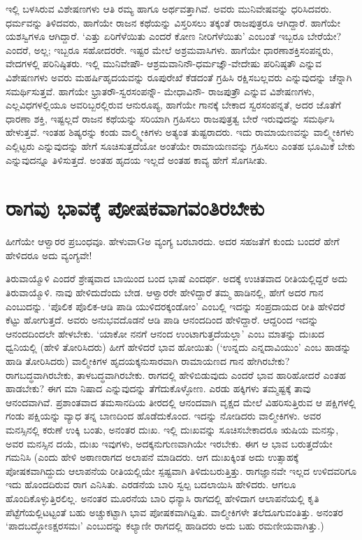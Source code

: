 ಇಲ್ಲಿ ಬಳಸಿರುವ ವಿಶೇಷಣಗಳು ಆತಿ ರಮ್ಯ ಹಾಗೂ ಅರ್ಥವತ್ತಾಗಿವೆ. ಅವರು ಮುನಿವೇಷವನ್ನು ಧರಿಸಿದವರು. ಧರ್ಮವನ್ನು ತಿಳಿದವರು, ಹಾಗೆಯೇ ರಾಜನ ಕಥೆಯನ್ನು ವಿಸ್ತರಿಸಲು ತಕ್ಕಂತೆ ರಾಜಪುತ್ರರೂ ಆಗಿದ್ದಾರೆ. ಹಾಗೆಯೇ ಯಶಸ್ವಿಗಳೂ ಆಗಿದ್ದಾರೆ. `ಎತ್ತು ಏರಿಗೆಳೆಯಿತು ಎಂದರೆ ಕೋಣ ನೀರಿಗೆಳೆಯಿತು' ಎಂಬಂತೆ ಇಬ್ಬರೂ ಬೇರೆಯೇ? ಎಂದರೆ, ಅಲ್ಲ; ಇಬ್ಬರೂ ಸಹೋದರರೇ. ಇಷ್ಟರ ಮೇಲೆ ಅಶ್ರಮವಾಸಿಗಳು. ಹಾಗೆಯೇ ಧಾರಣಾಶಕ್ತಿಸಂಪನ್ನರು, ವೇದಗಳಲ್ಲಿ ಪರಿನಿಷ್ಠಿತರು. ಇಲ್ಲಿ ಮುನಿವೇಷೌ- ಆಶ್ರಮವಾನಿನೌ-ಧರ್ಮಜ್ಞೌ-ವೇದೇಷು ಪರಿನಿಷ್ಠತೌ ಎನ್ನುವ ವಿಶೇಷಣಗಳು ಅವರು ಮಹರ್ಷಿಹೃದಯವನ್ನು ರೂಪುರೇಖೆ ಕೆಡದಂತೆ ಗ್ರಹಿಸಿ ರಕ್ಷಿಸಬಲ್ಲವರು ಎನ್ನುವುದನ್ನು ಚೆನ್ನಾಗಿ ಸಮರ್ಥಿಸುತ್ತವೆ. ಹಾಗೆಯೇ ಭ್ರಾತರೌ-ಸ್ವರಸಂಪನ್ನೌ- ಮೇಧಾವಿನೌ- ರಾಜಪುತ್ರೌ ಎನ್ನುವ ವಿಶೇಷಣಗಳು, ಎಲ್ಲವಿಧಗಳಲ್ಲಿಯೂ ಅವರಿಬ್ಬರಲ್ಲಿರುವ ಆನುರೂಪ್ಯ, ಹಾಗೆಯೇ ಗಾನಕ್ಕೆ ಬೇಕಾದ ಸ್ವರಸಂಪನ್ನತೆ, ಅದರ ಜೊತೆಗೆ ಧಾರಣಾ ಶಕ್ತಿ, ಇಷ್ಟಲ್ಲದೆ ರಾಜನ ಕಥೆಯನ್ನು ಸರಿಯಾಗಿ ಗ್ರಹಿಸಲು ರಾಜಪುತ್ರತ್ವ ಬೇರೆ ಇರುವುದನ್ನು ಸಮರ್ಥಿಸಿ ಹೇಳುತ್ತವೆ. ಇಂತಹ ಶಿಷ್ಯರನ್ನು ಕಂಡು ವಾಲ್ಮ್ಮೀಕಿಗಳು ಅತ್ಯಂತ ತುಷ್ಟರಾದರು. ಇದು ರಾಮಾಯಣವನ್ನು  ವಾಲ್ಮ್ಮೀಕಿಗಳು ಎಲ್ಲಿಟ್ಟರು ಎನ್ನುವುದನ್ನು ಹೇಗೆ ಸೂಚಿಸುತ್ತದೆಯೋ ಅಂತೆಯೇ ರಾಮಾಯಣವನ್ನು ಗ್ರಹಿಸಲು ಎಂತಹ ಭೂಮಿಕೆ ಬೇಕು ಎನ್ನುವುದನ್ನೂ ತಿಳಿಸುತ್ತದೆ. ಅಂತಹ ಹೃದಯ ಇಲ್ಲದೆ ಅಂತಹ ಕಾವ್ಯ ಹೇಗೆ ಸೊಗಸೀತು. 

\section*{ರಾಗವು ಭಾವಕ್ಕೆ ಪೋಷಕವಾಗವಂತಿರಬೇಕು}

ಹೀಗೆಯೇ ಆಳ್ವಾರರ ಪ್ರಬಂಧವೂ. ಹೇಳುವಾGಅ ವ್ಯಂಗ್ಯ ಬರಬಾರದು. ಅದರ ಸಹಜತೆಗೆ ಕುಂದು ಬಂದರೆ ಹೇಗೆ ಹೇಳಿದರೂ ಅದು ವ್ಯಂಗ್ಯವೇ!

ತಿರುವಾಯ್ಮೊಳಿ ಎಂದರೆ ಶ್ರೇಷ್ಠವಾದ ಬಾಯಿಂದ ಬಂದ ಭಾಷೆ ಎಂದರ್ಥ. ಅದಕ್ಕೆ ಉಚಿತವಾದ ರೀತಿಯಲ್ಲಿದ್ದರೆ ಅದು ತಿರುವಾಯ್ಮೊಳಿ. ನಾವು ಹೇಳಿದುದೆಂದು ಬೇಡ. ಆಳ್ವಾರರೇ ಹೇಳಿದ್ದಾರೆ ತಮ್ಮ ಹಾಡಿನಲ್ಲಿ, ಹೇಗೆ ಅದರ ಗಾನ ಎಂಬುದನ್ನು. `ಪೊಲಿಕ ಪೊಲಿಕ-ಆಡಿ ಪಾಡಿ ಯುಳಿದರಕ್ಕಂಡೋಂ' ಎಂಬಲ್ಲಿ ಇದನ್ನು ಸಂಪ್ರದಾಯದ ರೀತಿ ಹೇಳಿದರೆ ಕೆಟ್ಟು ಹೋಗುತ್ತದೆ. ಅವರು ಅನುಭವದೊಡನೆ ಆಡಿ ಪಾಡಿ ಆನಂದದಿಂದ ಹೇಳಿದ್ದಾರೆ. ಆದ್ದರಿಂದ ಇದನ್ನು ಆನಂದದಿಂದಲೇ ಹೇಳಬೇಕು. `ಯಾಕೋ ನನಗೆ ಆನಂದ ಉಂಟಾಗುತ್ತದೆಯಲ್ಲಾ' ಎಂಬ ಮಾತನ್ನು ದುಃಖದ ಧ್ವನಿಯಲ್ಲಿ (ಹೇಳಿ ತೋರಿಸಿದರು) ಹೀಗೆ ಹೇಳಿದರೆ ಭಾವ ಹೋಯಿತು (`ಉನ್ನದು ಎನ್ನದಾವಿಯುಂ' ಎಂಬ ಹಾಡನ್ನು ಹಾಡಿ ತೋರಿಸಿದರು) ವಾಲ್ಮೀಕಿಗಳ ಹೃದಯಕ್ಕನುಸಾರವಾಗಿ ರಾಮಾಯಣದ ಗಾನ ಹೇಗಿರಬೇಕು? ರಾಗಬದ್ಧವಾಗಿರಬೇಕು, ತಾಳಬದ್ಧವಾಗಿರಬೇಕು. ರಾಗದಲ್ಲಿ ಹೇಳಿಬಿಡುವುದು ಎಂದರೆ ಭಾವ ಹಾರಿಹೋದರೆ ಎಂತಹ ಹಾಡಬೇಕು? ಈಗ ಮಾ ನಿಷಾದ ಎನ್ನುವುದನ್ನು ತೆಗೆದುಕೊಳ್ಳೋಣ. ಎರಡು ಹಕ್ಕಿಗಳು ತಮ್ಮಷ್ಟಕ್ಕೆ ತಾವು ಆನಂದವಾಗಿವೆ. ಪ್ರಶಾಂತವಾದ ತಮಸಾನದಿಯ ತೀರದಲ್ಲಿ ಆನಂದವಾಗಿ ವೃಕ್ಷದ ಮೇಲೆ ವಿಹರಿಸುತ್ತಿರುವ ಆ ಪಕ್ಷಿಗಳಲ್ಲಿ ಗಂಡು ಪಕ್ಷಿಯನ್ನು ವ್ಯಾಧ ತನ್ನ ಬಾಣದಿಂದ ಹೊಡೆದುಕೊಂದ. ಇದನ್ನು ನೋಡಿದರು ವಾಲ್ಮೀಕಿಗಳು. ಅವರ ಮನಸ್ಸಿನಲ್ಲಿ ಕರುಣೆ ಉಕ್ಕಿ ಬಂತು, ಅನಂತರ ದುಃಖ. ಇಲ್ಲಿ ದುಃಖವನ್ನು ಸೂಚಿಸಬೇಕಾದರೂ ಋಷಿಯ ಮನಸ್ಸು, ಅವರ ಮನಸ್ಸಿನ ದಯೆ, ದುಃಖ ಇವುಗಳು, ಅದಕ್ಕನುಗುಣವಾಗಿಯೇ ಇರಬೇಕು. ಈಗ ಆ ಭಾವ ಬರುತ್ತದೆಯೇ ಗಮನಿಸಿ (ಎಂದು ಹೇಳಿ ಅಠಾಣರಾಗದ ಅಲಾಪನೆ ಮಾಡಿದರು. ಆಗ ದುಃಖಕ್ಕಿಂತ ಅದು ಉತ್ಸಾಹಕ್ಕೆ ಪೋಷಕವಾಗಿದ್ದುದು ಆಲಾಪನೆಯ ರೀತಿಯಲ್ಲಿಯೇ ಸ್ಪಷ್ಟವಾಗಿ ತಿಳಿದುಬರುತ್ತಿತ್ತು. ರಾಗಜ್ಞಾನವೇ ಇಲ್ಲದ ಉಳಿದವರಿಗೂ ಇದು ಹೊಂದದಿರುವ ರಾಗ ಎನಿಸಿತು. ಎರಡನೆಯ ಬಾರಿ ಸ್ವಲ್ಪ ಬದಲಾಯಿಸಿ ಹೇಳಿದರು. ಆಗಲೂ ಹೊಂದಿಕೊಳ್ಳುತ್ತಿರಲಿಲ್ಲ. ಅನಂತರ ಮೂರನೆಯ ಬಾರಿ ಧನ್ಯಾಸಿ ರಾಗದಲ್ಲಿ ಹೇಳಿದಾಗ ಆಲಾಪನೆಯಲ್ಲಿ ಕೃತಿ ಪೆಟ್ಟೆಗೆಯಲ್ಲಿಟಟ್ಟಂತೆ ಬಹು ಅಚ್ಚುಕಟ್ಟಾಗಿ ಭಾವ ಪೋಷಕವಾಗಿದ್ದಿತು. ವಾಲ್ಮೀಕಿಗಳೇ ತಲೆದೂಗುವಂತಿತ್ತು. ಅನಂತರ `ಪಾದಬದ್ಧೋಽಕ್ಷರಸಮಃ'\label{242} ಎಂಬುದನ್ನು ಕಲ್ಯಾಣೀ ರಾಗದಲ್ಲಿ ಹಾಡಿದರು ಅದು ಬಹು ರಮಣೀಯವಾಗಿತ್ತು.)


